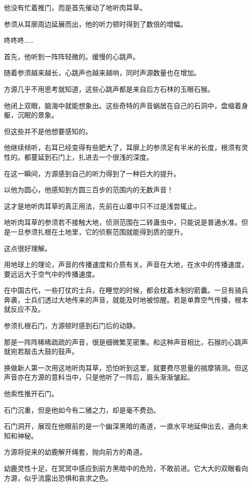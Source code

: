 \begin{this_body}
他没有忙着推门，而是首先催动了地听肉耳草。

参须从耳廓周边延展而出，他的听力顿时得到了数倍的增幅。

咚咚咚……

首先，他听到一阵阵轻微的。缓慢的心跳声。

随着参须越来越长，心跳声也越来越响，同时声源数量也在增加。

方源几乎不用思考就知道，这些心跳声都是来自后方石林的玉眼石猴。

他闭上双眼，脑海中就能想象出。这些奇特的声音蜗居在自己的石洞中，盘缩着身躯，沉眠的景象。

但这些并不是他想要感知的。

他继续倾听，右耳已经变得有些肥大了，耳廓上的参须足有半米的长度，根须有灵性的。都蔓延到石门上，扎进去一个很浅的深度。

在这一瞬间，方源感到自己的听力得到了一种巨大的提升。

以他为圆心，他感知到方圆三百步的范围内的无数声音！

这才是地听肉耳草的真正用法，先前在山寨中只不过是浅尝辄止。

地听肉耳草的参须若不接触大地，侦测范围在二转蛊虫中，只能说是普通水准。但是一旦参须扎根在土地里，它的侦察范围就能得到质的提升。

这点很好理解。

用地球上的理论，声音的传播速度和介质有关。声音在大地，在水中的传播速度，要远远大于空气中的传播速度。

在中国古代，一些打仗的士兵，在睡觉的时候，都会枕着木制的箭囊。一旦有骑兵奔袭，士兵们透过大地传来的声音，就能及时地被惊醒。若是单靠空气传播，根本就反应不及。

参须扎根石门，方源顿时感到石门后的动静。

那是一阵阵稀稀疏疏的声音，很是细微繁芜密集。和这种声音相比，石猴的心跳声就宛若敲击大鼓的鼓声。

换做新人第一次用这地听肉耳草，恐怕听到这里，就要费尽思量的揣摩猜测。但这声音亦在方源的意料当中，只是他听了一阵后，眉头渐渐皱起。

他索性推开石门。

石门沉重，但是他如今有二猪之力，却是毫不费劲。

石门洞开，展现在他眼前的是一个幽深黑暗的甬道，一直水平地延伸出去，通向未知和神秘。

方源将捉来的幼鹿解开绳套，抛向前方的甬道。

幼鹿灵性十足，在冥冥中感应到前方黑暗中的危险，不敢前进。它大大的双眼看向方源，似乎流露出恐惧和哀求之色。


\end{this_body}
